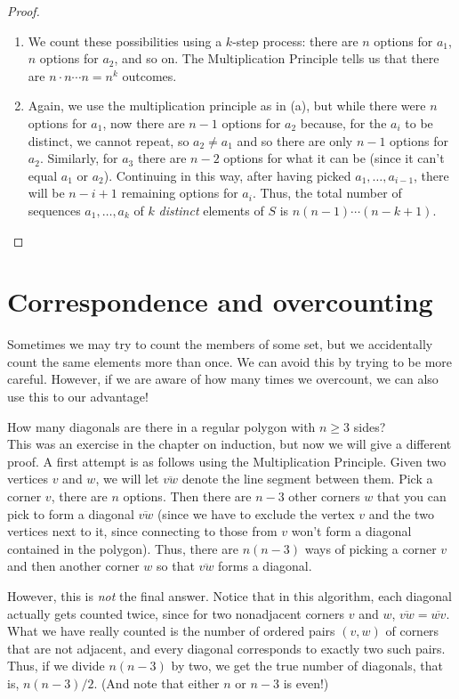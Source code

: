 \documentclass[11pt,dvipsnames]{book}
\numberwithin{figure}{section} %
\numberwithin{table}{section} %
\begin{document}
\begin{proof}
\begin{enumerate}[label=(\alph*)]
\item We count these possibilities using a $k$-step process: there are $n$ options for $a_1$, $n$ options for $a_2$, and so on. The Multiplication Principle tells us that there are $n\cdot n\cdots n = n^{k}$ outcomes.
\item Again, we use the multiplication principle as in (a), but while there were $n$ options for $a_1$, now there are $n-1$ options for $a_2$ because, for the $a_i$ to be distinct, we cannot repeat, so $a_{2}\neq a_{1}$ and so there are only $n-1$ options for $a_2$. Similarly, for $a_{3}$ there are $n-2$ options for what it can be (since it can't equal $a_{1}$ or $a_{2}$). Continuing in this way, after having picked $a_{1},\dots,a_{i-1}$, there will be $n-i+1$ remaining options for $a_i$. Thus, the total number of sequences $a_{1}, \dots ,a_{k}$ of $k$ {\it distinct} elements of $S$ is $n(n-1)\cdots (n-k+1) $.
\end{enumerate}
\end{proof}

\section{Correspondence and overcounting}%
\label{correspendenceandovercounting}

\indent Sometimes we may try to count the members of some set, but we accidentally count the same elements more than once. We can avoid this by trying to be more careful. However, if we are aware of how many times we overcount, we can also use this to our advantage!

\begin{example}
How many diagonals are there in a regular polygon with $n \geq 3$ sides?\\

This was an exercise in the chapter on induction, but now we will give a different proof. A first attempt is as follows using the Multiplication Principle. Given two vertices $v$ and $w$, we will let $\overline{vw}$ denote the line segment between them. Pick a corner $v$, there are $n$ options. Then there are $n-3$ other corners $w$ that you can pick to form a diagonal $\overline{vw}$ (since we have to exclude the vertex $v$ and the two vertices next to it, since connecting to those from $v$ won't form a diagonal contained in the polygon). Thus, there are $n(n-3)$ ways of picking a corner $v$ and then another corner $w$ so that $\overline{vw}$ forms a diagonal.

However, this is {\it not} the final answer. Notice that in this algorithm, each diagonal actually gets counted twice, since for two nonadjacent corners $v$ and $w$, $\overline{vw}=\overline{wv}$. What we have really counted is the number of ordered pairs $(v,w)$ of corners that are not adjacent, and every diagonal corresponds to exactly two such pairs. Thus, if we divide $n(n-3)$ by two, we get the true number of diagonals, that is, $n(n-3)/2$. (And note that either $n$ or $n-3$ is even!)
\end{example}
\end{document}
